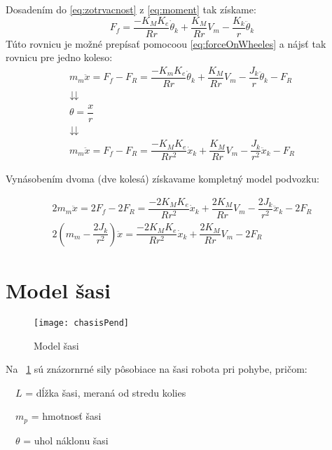 Dosadením do \eqref{eq:zotrvacnost} z \eqref{eq:moment} tak získame:
\begin{equation}
F_f = \dfrac{-K_M K_e}{Rr}\dot{\theta}_k + \dfrac{K_M}{Rr}V_m - \dfrac{K_k}{r}\ddot{\theta}_k
\end{equation}
Túto rovnicu je možné prepísať pomocoou \eqref{eq:forceOnWheeles} a nájsť tak rovnicu pre jedno koleso:
\begin{equation}
\begin{gathered}
m_m \ddot{x} = F_f - F_R =  \dfrac{-K_m K_e}{Rr}\dot{\theta}_k + \dfrac{K_M}{Rr}V_m - \dfrac{J_k}{r}\ddot{\theta}_k - F_R \\
\downdownarrows
\\
\theta = \dfrac{x}{r}
\\
\downdownarrows
\\
m_m \ddot{x} = F_f - F_R = \dfrac{-K_M K_e}{R r^2}\dot{x}_k + \dfrac{K_M}{Rr}V_m - \dfrac{J_k}{r^2}\ddot{x}_k - F_R
\end{gathered}
\end{equation}

Vynásobením dvoma (dve kolesá) získavame kompletný model podvozku:

\begin{equation}
\begin{gathered}
2m_m \ddot{x} = 2F_f - 2F_R = \dfrac{-2K_M K_e}{R r^2}\dot{x}_k + \dfrac{2K_M}{Rr}V_m - \dfrac{2J_k}{r^2}\ddot{x}_k - 2F_R
\\
2(m_m - \dfrac{2J_k}{r^2}) \ddot{x} = \dfrac{-2K_M K_e}{R r^2}\dot{x}_k + \dfrac{2K_M}{Rr}V_m - 2F_R
\end{gathered}
\label{eq:wheels}
\end{equation}

\section{Model šasi}


\begin{figure}[b]
\centering
\texttt{[image: chasisPend]}
\caption{Model šasi}
\label{fig:chasisPend}
\end{figure}

Na \figurename~\ref{fig:chasisPend} sú znázornrné sily pôsobiace na šasi robota pri pohybe, pričom:

$\quad L$ = dĺžka šasi, meraná od stredu kolies

$\quad m_p$ = hmotnosť šasi

$\quad \theta$ = uhol náklonu šasi

